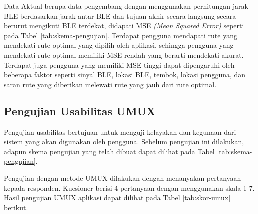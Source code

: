 \begin{table}[H]
\caption{Skema Pengujian Akurasi Pengambilan Rute di Gedung A FMIPA Optimal dalam MSE \textit{(Mean Squared Error)}}
\label{tab:skema-pengujian}
\end{table}

\par Data Aktual berupa data pengembang dengan menggunakan perhitungan jarak BLE berdasarkan jarak antar BLE dan tujuan akhir secara langsung secara berurut mengikuti BLE terdekat, didapati MSE \textit{(Mean Squared Error)} seperti pada Tabel \ref{tab:skema-pengujian}. Terdapat pengguna mendapati rute yang mendekati rute optimal yang dipilih oleh aplikasi, sehingga pengguna yang mendekati rute optimal memiliki MSE rendah yang berarti mendekati akurat. Terdapat juga pengguna yang memiliki MSE tinggi dapat dipengaruhi oleh beberapa faktor seperti sinyal BLE, lokasi BLE, tembok, lokasi pengguna, dan saran rute yang diberikan melewati rute yang jauh dari rute optimal.

\newpage
\subsection{Pengujian Usabilitas UMUX}
\par Pengujian usabilitas bertujuan untuk menguji kelayakan dan kegunaan dari sistem yang akan digunakan oleh pengguna. Sebelum pengujian ini dilakukan, adapun skema pengujian yang telah dibuat dapat dilihat pada Tabel \ref{tab:skema-pengujian}.

\par Pengujian dengan metode UMUX dilakukan dengan menanyakan pertanyaan kepada responden. Kuesioner berisi 4 pertanyaan dengan menggunakan skala 1-7. Hasil pengujian UMUX aplikasi dapat dilihat pada Tabel \ref{tab:skor-umux} berikut.

